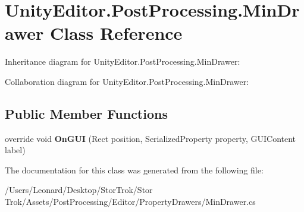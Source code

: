 \hypertarget{class_unity_editor_1_1_post_processing_1_1_min_drawer}{}\section{Unity\+Editor.\+Post\+Processing.\+Min\+Drawer Class Reference}
\label{class_unity_editor_1_1_post_processing_1_1_min_drawer}


Inheritance diagram for Unity\+Editor.\+Post\+Processing.\+Min\+Drawer\+:


Collaboration diagram for Unity\+Editor.\+Post\+Processing.\+Min\+Drawer\+:
\subsection*{Public Member Functions}
\begin{DoxyCompactItemize}
\item 
\mbox{\label{class_unity_editor_1_1_post_processing_1_1_min_drawer_ad2ca5ec821cabdc3ca03f592c3404949}} 
override void {\bfseries On\+G\+UI} (Rect position, Serialized\+Property property, G\+U\+I\+Content label)
\end{DoxyCompactItemize}


The documentation for this class was generated from the following file\+:\begin{DoxyCompactItemize}
\item 
/\+Users/\+Leonard/\+Desktop/\+Stor\+Trok/\+Stor Trok/\+Assets/\+Post\+Processing/\+Editor/\+Property\+Drawers/Min\+Drawer.\+cs\end{DoxyCompactItemize}
